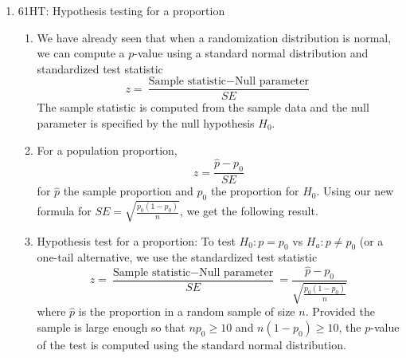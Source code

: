 \documentclass{article}
\begin{document}
\begin{enumerate}
\item 61HT: Hypothesis testing for a proportion
\begin{enumerate}

\item We have already seen that when a randomization distribution is normal, we can compute a $p$-value using a standard normal distribution and standardized test statistic
\[
z = \frac{\text{Sample statistic} - \text{Null parameter}}{SE}
\]
The sample statistic is computed from the sample data and the null parameter is specified by the null hypothesis $H_0$.

\item For a population proportion,
\[
z = \frac{\hat{p}-p_0}{SE}
\]
for $\hat{p}$ the sample proportion and $p_0$ the proportion for $H_0$. Using our new formula for $SE = \sqrt{\frac{p_0(1-p_0)}{n}}$, we get the following result.

\item Hypothesis test for a proportion: To test $H_0: p=p_0$ vs $H_a: p \neq p_0$ (or a one-tail alternative, we use the standardized test statistic
\[
z = \frac{\text{Sample statistic} - \text{Null parameter}}{SE} = \frac{\hat{p}-p_0}{\sqrt{\frac{p_0(1-p_0)}{n}}}
\]
where $\hat{p}$ is the proportion in a random sample of size $n$. Provided the sample is large enough so that $np_0 \geq 10$ and $n(1-p_0) \geq 10$, the $p$-value of the test is computed using the standard normal distribution.

\end{enumerate}
\end{enumerate}

\end{document}
